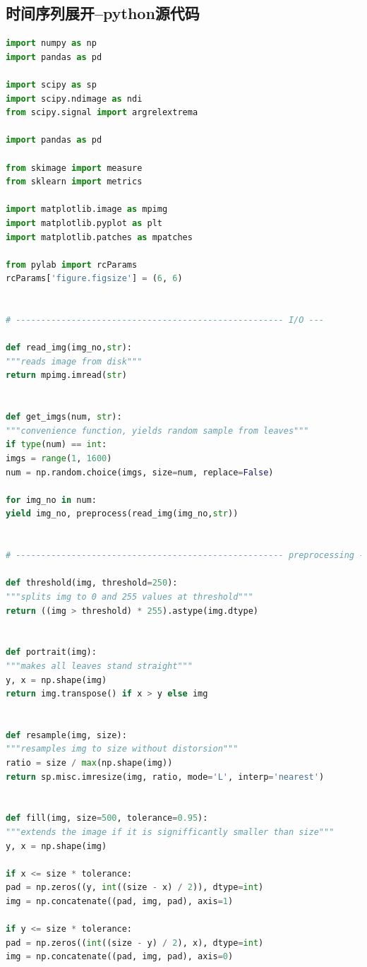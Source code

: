\documentclass{whutmod}
\begin{document}
\subsection{时间序列展开--python源代码}
\begin{lstlisting}[language=python]%这里修改语言
import numpy as np
import pandas as pd

import scipy as sp
import scipy.ndimage as ndi
from scipy.signal import argrelextrema

import pandas as pd

from skimage import measure
from sklearn import metrics

import matplotlib.image as mpimg
import matplotlib.pyplot as plt
import matplotlib.patches as mpatches

from pylab import rcParams
rcParams['figure.figsize'] = (6, 6)


# ----------------------------------------------------- I/O ---

def read_img(img_no,str):
"""reads image from disk"""
return mpimg.imread(str)


def get_imgs(num, str):
"""convenience function, yields random sample from leaves"""
if type(num) == int:
imgs = range(1, 1600)
num = np.random.choice(imgs, size=num, replace=False)

for img_no in num:
yield img_no, preprocess(read_img(img_no,str))


# ----------------------------------------------------- preprocessing ---

def threshold(img, threshold=250):
"""splits img to 0 and 255 values at threshold"""
return ((img > threshold) * 255).astype(img.dtype)


def portrait(img):
"""makes all leaves stand straight"""
y, x = np.shape(img)
return img.transpose() if x > y else img


def resample(img, size):
"""resamples img to size without distorsion"""
ratio = size / max(np.shape(img))
return sp.misc.imresize(img, ratio, mode='L', interp='nearest')


def fill(img, size=500, tolerance=0.95):
"""extends the image if it is signifficantly smaller than size"""
y, x = np.shape(img)

if x <= size * tolerance:
pad = np.zeros((y, int((size - x) / 2)), dtype=int)
img = np.concatenate((pad, img, pad), axis=1)

if y <= size * tolerance:
pad = np.zeros((int((size - y) / 2), x), dtype=int)
img = np.concatenate((pad, img, pad), axis=0)


\end{lstlisting}
\end{document}
